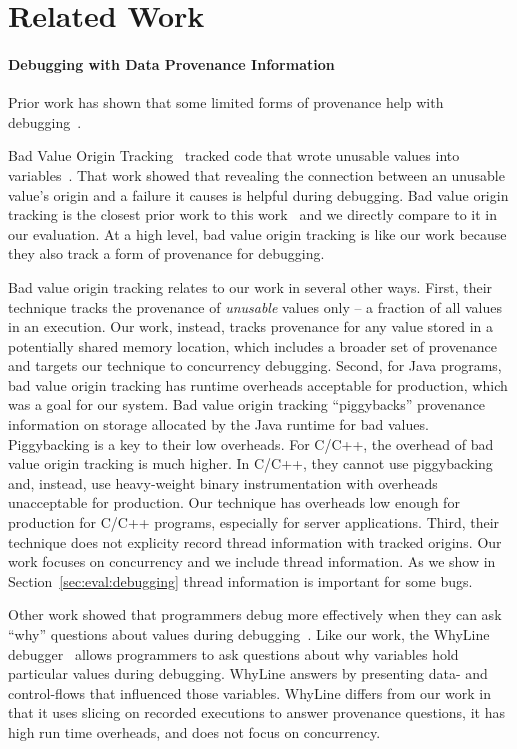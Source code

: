 \documentclass[10pt,nocopyrightspace]{sigplanconf}
\begin{document}
\section{Related Work}


\paragraph{Debugging with Data Provenance Information}
Prior work has shown that some limited forms of provenance help
with debugging~\cite{badapples, whylineicse, tipslicingsurvey}. 



Bad Value Origin Tracking~\cite{badapples} tracked code that wrote unusable
values into variables~\cite{badapples}. That work showed that revealing the
connection between an unusable value's origin and a failure it causes is
helpful during debugging.  Bad value origin tracking is the closest prior work
to this work~\cite{badapples} and we directly compare to it in our evaluation.
At a high level, bad value origin tracking is like our work because they also track
a form of provenance for debugging.  

Bad value origin tracking relates to our work in several other ways.  First,
their technique tracks the provenance of {\em unusable} values only -- a
fraction of all values in an execution.  Our work, instead, tracks provenance
for any value stored in a potentially shared memory location, which includes a
broader set of provenance and targets our technique to concurrency debugging.
Second, for Java programs, bad value origin tracking has runtime overheads
acceptable for production, which was a goal for our system.  Bad value origin
tracking ``piggybacks'' provenance information on storage allocated by the Java
runtime for bad values.  Piggybacking is a key to their low overheads.  For
C/C++, the overhead of bad value origin tracking is much higher.  In C/C++,
they cannot use piggybacking and, instead, use heavy-weight binary
instrumentation with overheads unacceptable for production.  Our technique has
overheads low enough for production for C/C++ programs, especially for server
applications.  Third, their technique does not explicity record thread
information with tracked origins.  Our work focuses on concurrency and we
include thread information.  As we show in Section~\ref{sec:eval:debugging}
thread information is important for some bugs.  

Other work showed that programmers debug more effectively when they can ask
``why'' questions about values during
debugging~\cite{tipslicingsurvey,whylineicse}.  Like our work, the WhyLine
debugger~\cite{whylineicse, whylinechi} allows programmers to ask questions
about why variables hold particular values during debugging.  WhyLine answers
by presenting data- and control-flows that influenced those variables.  WhyLine
differs from our work in that it uses slicing on recorded executions to answer
provenance questions, it has high run time overheads, and does not focus on
concurrency.
\end{document}
